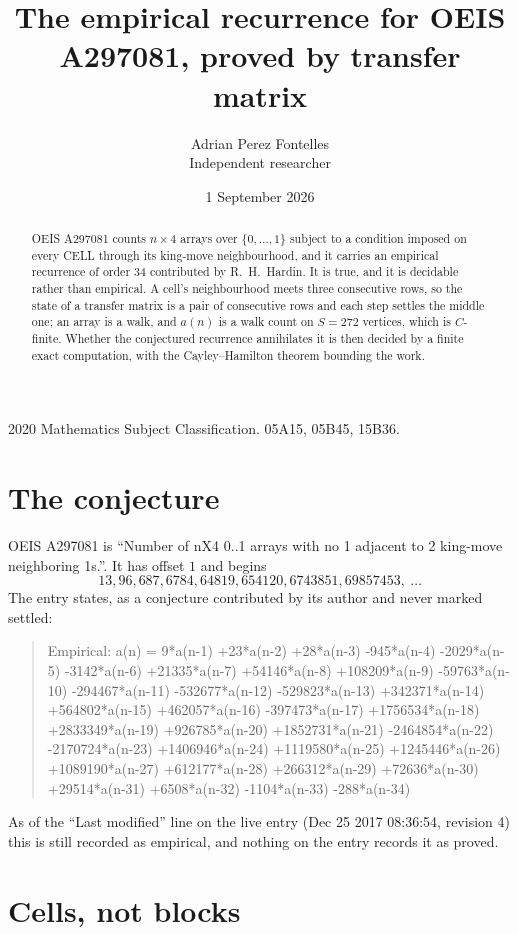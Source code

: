\documentclass[11pt,a4paper]{article}
\title{The empirical recurrence for OEIS A297081, proved by transfer matrix}
\author{Adrian Perez Fontelles\\ \small Independent researcher}
\date{1 September 2026}
\theoremstyle{plain}
\theoremstyle{definition}
\begin{document}
\maketitle

\begin{abstract}
OEIS A297081 counts $n\times4$ arrays over $\{0,\dots,1\}$ subject to a condition imposed on
every CELL through its king-move neighbourhood, and it carries an empirical recurrence of
order $34$ contributed by R.~H.~Hardin. It is true, and it is decidable rather than
empirical. A cell's neighbourhood meets three consecutive rows, so the state of a transfer
matrix is a pair of consecutive rows and each step settles the middle one; an array is a
walk, and $a(n)$ is a walk count on $S=272$ vertices, which is $C$-finite. Whether the
conjectured recurrence annihilates it is then decided by a finite exact computation, with the
Cayley--Hamilton theorem bounding the work.
\end{abstract}

\noindent\small 2020 Mathematics Subject Classification. 05A15, 05B45, 15B36.\normalsize

\section{The conjecture}

OEIS A297081 is ``Number of nX4 0..1 arrays with no 1 adjacent to 2 king-move neighboring 1s.''. It has offset $1$ and begins
\[
13, 96, 687, 6784, 64819, 654120, 6743851, 69857453,\ \dots
\]
The entry states, as a conjecture contributed by its author and never marked settled:
\begin{quote}
Empirical: a(n) = 9*a(n-1) +23*a(n-2) +28*a(n-3) -945*a(n-4) -2029*a(n-5) -3142*a(n-6) +21335*a(n-7) +54146*a(n-8) +108209*a(n-9) -59763*a(n-10) -294467*a(n-11) -532677*a(n-12) -529823*a(n-13) +342371*a(n-14) +564802*a(n-15) +462057*a(n-16) -397473*a(n-17) +1756534*a(n-18) +2833349*a(n-19) +926785*a(n-20) +1852731*a(n-21) -2464854*a(n-22) -2170724*a(n-23) +1406946*a(n-24) +1119580*a(n-25) +1245446*a(n-26) +1089190*a(n-27) +612177*a(n-28) +266312*a(n-29) +72636*a(n-30) +29514*a(n-31) +6508*a(n-32) -1104*a(n-33) -288*a(n-34)
\end{quote}
As of the ``Last modified'' line on the live entry (Dec 25 2017 08:36:54, revision 4) this is still
recorded as empirical, and nothing on the entry records it as proved.

\section{Cells, not blocks}
\end{document}
